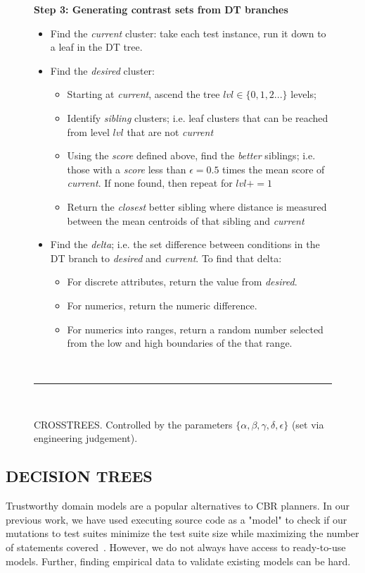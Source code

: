 \documentclass{sig-alternate}
\newcommand{\bi}{\begin{itemize}[leftmargin=0.4cm]}
\newcommand{\ei}{\end{itemize}}
\begin{document}
\begin{figure}[t]
	{\bf Step 3: Generating contrast sets from DT branches}
	\begin{itemize}
		\item Find the {\em current } cluster: take each test instance, run it down to a leaf in the DT tree.  
		\item Find the {\em desired} cluster: 
		\bi
		\item Starting at {\em current}, ascend the tree $lvl\in \{0,1,2...\}$ levels;
		\item Identify {\em sibling} clusters; i.e. leaf clusters that can be reached from level $lvl$ that are not {\em current }
		\item Using the {\em score} defined above, find the {\em better} siblings; i.e. those with a {\em score} less than $\epsilon=0.5$ times the mean score of {\em current}. If none found, then repeat for $lvl += 1$
		\item  Return the {\em closest} better sibling where distance is measured between the mean centroids of that sibling and {\em current}
		\ei
		\item Find the {\em delta}; i.e. the set difference between  conditions in the DT branch to {\em desired} and {\em current}. To find that delta:
		\bi
		\item
		For discrete attributes,  return the value from {\em desired}. 
		\item
		For  numerics, return the numeric difference. 
		\item
		For numerics  into ranges, return a random number selected from the low and high boundaries of the that range.
		\ei
		\ei
		~\hrule~
		\caption{CROSSTREES. Controlled by the parameters
			$\{\alpha, \beta, \gamma, \delta, \epsilon\}$ (set via engineering judgement).}
		\label{fig:xtrees_bare}
	\end{figure}



\subsection{DECISION TREES}

Trustworthy domain models are a popular alternatives to CBR planners. In our previous work, we have used executing source code as a "model" to check if our mutations to test suites minimize the test suite size while maximizing the number of statements covered~\cite{me09m,andrews07,andrews10}. However, we do not always have access to ready-to-use models. Further, finding empirical data to validate existing models can be hard. 
\end{document}
